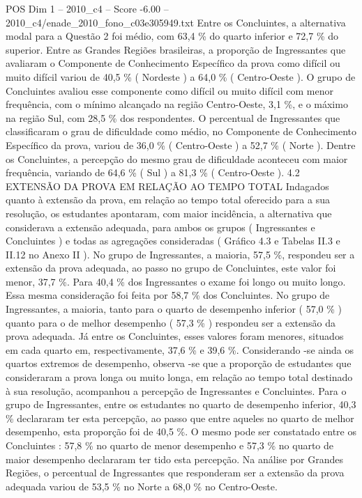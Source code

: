 \begin{textsample}{POS Dim 1 – 2010\_c4 – Score -6.00 – 2010\_c4/enade\_2010\_fono\_c03e305949.txt}
Entre os Concluintes, a alternativa modal para a Questão 2 foi médio, com 63,4 \% do quarto inferior e 72,7 \% do superior.
Entre as Grandes Regiões brasileiras, a proporção de Ingressantes que avaliaram o Componente de Conhecimento Específico da prova como difícil ou muito difícil variou de 40,5 \% ( Nordeste ) a 64,0 \% ( Centro-Oeste ).
O grupo de Concluintes avaliou esse componente como difícil ou muito difícil com menor frequência, com o mínimo alcançado na região Centro-Oeste, 3,1 \%, e o máximo na região Sul, com 28,5 \% dos respondentes.
O percentual de Ingressantes que classificaram o grau de dificuldade como médio, no Componente de Conhecimento Específico da prova, variou de 36,0 \% ( Centro-Oeste ) a 52,7 \% ( Norte ).
Dentre os Concluintes, a percepção do mesmo grau de dificuldade aconteceu com maior frequência, variando de 64,6 \% ( Sul ) a 81,3 \% ( Centro-Oeste ). 4.2 EXTENSÃO DA PROVA EM RELAÇÃO AO TEMPO TOTAL Indagados quanto à extensão da prova, em relação ao tempo total oferecido para a sua resolução, os estudantes apontaram, com maior incidência, a alternativa que considerava a extensão adequada, para ambos os grupos ( Ingressantes e Concluintes ) e todas as agregações consideradas ( Gráfico 4.3 e Tabelas II.3 e II.12 no Anexo II ).
No grupo de Ingressantes, a maioria, 57,5 \%, respondeu ser a extensão da prova adequada, ao passo no grupo de Concluintes, este valor foi menor, 37,7 \%.
Para 40,4 \% dos Ingressantes o exame foi longo ou muito longo.
Essa mesma consideração foi feita por 58,7 \% dos Concluintes.
No grupo de Ingressantes, a maioria, tanto para o quarto de desempenho inferior ( 57,0 \% ) quanto para o de melhor desempenho ( 57,3 \% ) respondeu ser a extensão da prova adequada.
Já entre os Concluintes, esses valores foram menores, situados em cada quarto em, respectivamente, 37,6 \% e 39,6 \%.
Considerando -se ainda os quartos extremos de desempenho, observa -se que a proporção de estudantes que consideraram a prova longa ou muito longa, em relação ao tempo total destinado à sua resolução, acompanhou a percepção de Ingressantes e Concluintes.
Para o grupo de Ingressantes, entre os estudantes no quarto de desempenho inferior, 40,3 \% declararam ter esta percepção, ao passo que entre aqueles no quarto de melhor desempenho, esta proporção foi de 40,5 \%.
O mesmo pode ser constatado entre os Concluintes : 57,8 \% no quarto de menor desempenho e 57,3 \% no quarto de maior desempenho declararam ter tido esta percepção.
Na análise por Grandes Regiões, o percentual de Ingressantes que responderam ser a extensão da prova adequada variou de 53,5 \% no Norte a 68,0 \% no Centro-Oeste.

\end{textsample}
